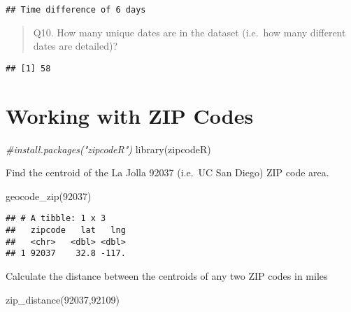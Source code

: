 \documentclass[
]{article}
\newenvironment{Shaded}{\begin{snugshade}}{\end{snugshade}}
\newcommand{\CommentTok}[1]{\textcolor[rgb]{0.56,0.35,0.01}{\textit{#1}}}
\newcommand{\FunctionTok}[1]{\textcolor[rgb]{0.00,0.00,0.00}{#1}}
\newcommand{\NormalTok}[1]{#1}
\newcommand{\SpecialCharTok}[1]{\textcolor[rgb]{0.00,0.00,0.00}{#1}}
\newcommand{\StringTok}[1]{\textcolor[rgb]{0.31,0.60,0.02}{#1}}
\begin{document}
\begin{verbatim}
## Time difference of 6 days
\end{verbatim}

\begin{quote}
Q10. How many unique dates are in the dataset (i.e.~how many different
dates are detailed)?
\end{quote}

\begin{Shaded}
\end{Shaded}

\begin{verbatim}
## [1] 58
\end{verbatim}

\hypertarget{working-with-zip-codes}{%
\section{Working with ZIP Codes}\label{working-with-zip-codes}}

\begin{Shaded}
\begin{Highlighting}[]
\CommentTok{\#install.packages("zipcodeR")}
\FunctionTok{library}\NormalTok{(zipcodeR)}
\end{Highlighting}
\end{Shaded}

Find the centroid of the La Jolla 92037 (i.e.~UC San Diego) ZIP code
area.

\begin{Shaded}
\begin{Highlighting}[]
\FunctionTok{geocode\_zip}\NormalTok{(}\StringTok{\textquotesingle{}92037\textquotesingle{}}\NormalTok{)}
\end{Highlighting}
\end{Shaded}

\begin{verbatim}
## # A tibble: 1 x 3
##   zipcode   lat   lng
##   <chr>   <dbl> <dbl>
## 1 92037    32.8 -117.
\end{verbatim}

Calculate the distance between the centroids of any two ZIP codes in
miles

\begin{Shaded}
\begin{Highlighting}[]
\FunctionTok{zip\_distance}\NormalTok{(}\StringTok{\textquotesingle{}92037\textquotesingle{}}\NormalTok{,}\StringTok{\textquotesingle{}92109\textquotesingle{}}\NormalTok{)}
\end{Highlighting}
\end{Shaded}
\end{document}
